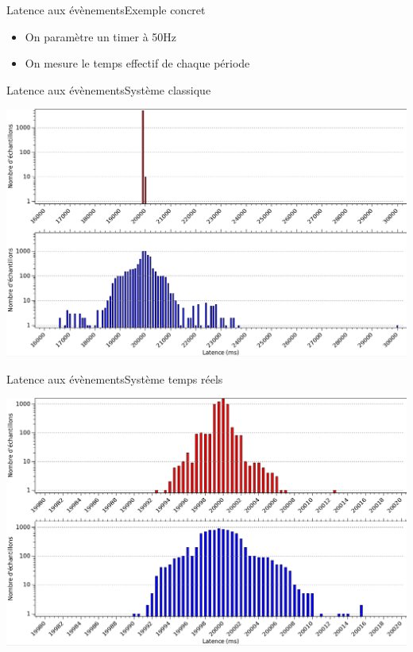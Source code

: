 \begin{frame}{Latence aux évènements}{Exemple concret}
  \begin{itemize}
  \item On paramètre un timer à 50Hz
  \item On mesure le temps effectif de chaque période
  \end{itemize}
\end{frame}

\begin{frame}{Latence aux évènements}{Système classique}
  \begin{center}
    \includegraphics[width=\textwidth]{latence_1}
  \end{center}
\end{frame}

\begin{frame}{Latence aux évènements}{Système temps réels}
  \begin{center}
    \includegraphics[width=\textwidth]{latence_2}
  \end{center}
\end{frame}

